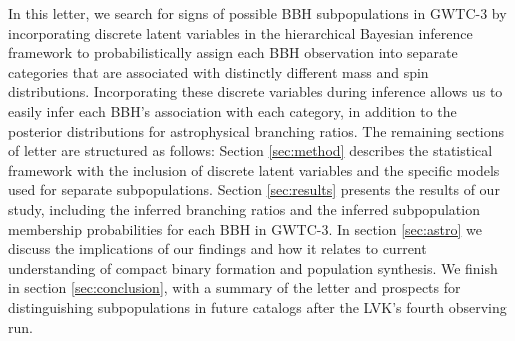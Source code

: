 In this letter, we search for signs of possible BBH subpopulations in GWTC-3 by incorporating discrete latent variables in the hierarchical Bayesian inference framework to probabilistically assign each BBH observation into separate categories that are associated with distinctly different mass and spin distributions. Incorporating these discrete variables during inference allows us to easily infer each BBH's association with each category, in addition to the posterior distributions for astrophysical branching ratios. The remaining sections of letter are structured as follows: Section \ref{sec:method} describes the statistical framework with the inclusion of discrete latent variables and the specific models used for separate subpopulations. Section \ref{sec:results} presents the results of our study, including the inferred branching ratios and the inferred subpopulation membership probabilities for each BBH in GWTC-3. In section \ref{sec:astro} we discuss the implications of our findings and how it relates to current understanding of compact binary formation and population synthesis. We finish in section \ref{sec:conclusion}, with a summary of the letter and prospects for distinguishing subpopulations in future catalogs after the LVK's fourth observing run. 
